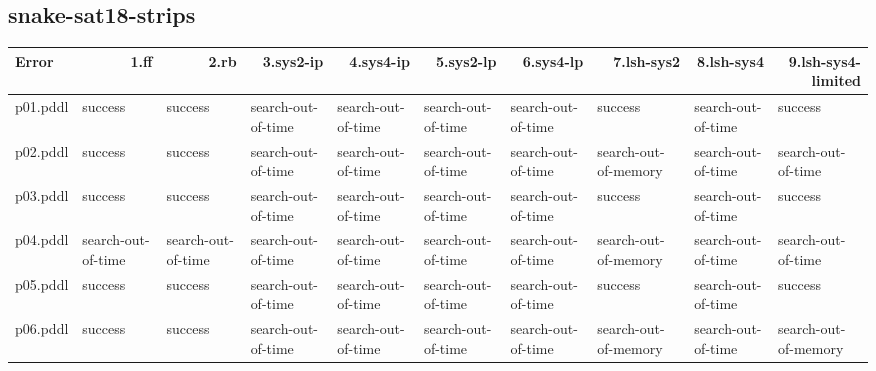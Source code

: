 \documentclass{article}
\begin{document}
\hypertarget{error-snake-sat18-strips}{}
\subsection*{snake-sat18-strips}

\begin{tabular}{@{}lrrrrrrrrr@{}}
Error & 1.ff & 2.rb & 3.sys2-ip & 4.sys4-ip & 5.sys2-lp & 6.sys4-lp & 7.lsh-sys2 & 8.lsh-sys4 & 9.lsh-sys4-limited \\
\midrule
p01.pddl & \multicolumn{1}{|l|}{success} & \multicolumn{1}{|l|}{success} & \multicolumn{1}{|l|}{search-out-of-time} & \multicolumn{1}{|l|}{search-out-of-time} & \multicolumn{1}{|l|}{search-out-of-time} & \multicolumn{1}{|l|}{search-out-of-time} & \multicolumn{1}{|l|}{success} & \multicolumn{1}{|l|}{search-out-of-time} & \multicolumn{1}{|l|}{success} \\
p02.pddl & \multicolumn{1}{|l|}{success} & \multicolumn{1}{|l|}{success} & \multicolumn{1}{|l|}{search-out-of-time} & \multicolumn{1}{|l|}{search-out-of-time} & \multicolumn{1}{|l|}{search-out-of-time} & \multicolumn{1}{|l|}{search-out-of-time} & \multicolumn{1}{|l|}{search-out-of-memory} & \multicolumn{1}{|l|}{search-out-of-time} & \multicolumn{1}{|l|}{search-out-of-time} \\
p03.pddl & \multicolumn{1}{|l|}{success} & \multicolumn{1}{|l|}{success} & \multicolumn{1}{|l|}{search-out-of-time} & \multicolumn{1}{|l|}{search-out-of-time} & \multicolumn{1}{|l|}{search-out-of-time} & \multicolumn{1}{|l|}{search-out-of-time} & \multicolumn{1}{|l|}{success} & \multicolumn{1}{|l|}{search-out-of-time} & \multicolumn{1}{|l|}{success} \\
p04.pddl & \multicolumn{1}{|l|}{search-out-of-time} & \multicolumn{1}{|l|}{search-out-of-time} & \multicolumn{1}{|l|}{search-out-of-time} & \multicolumn{1}{|l|}{search-out-of-time} & \multicolumn{1}{|l|}{search-out-of-time} & \multicolumn{1}{|l|}{search-out-of-time} & \multicolumn{1}{|l|}{search-out-of-memory} & \multicolumn{1}{|l|}{search-out-of-time} & \multicolumn{1}{|l|}{search-out-of-time} \\
p05.pddl & \multicolumn{1}{|l|}{success} & \multicolumn{1}{|l|}{success} & \multicolumn{1}{|l|}{search-out-of-time} & \multicolumn{1}{|l|}{search-out-of-time} & \multicolumn{1}{|l|}{search-out-of-time} & \multicolumn{1}{|l|}{search-out-of-time} & \multicolumn{1}{|l|}{success} & \multicolumn{1}{|l|}{search-out-of-time} & \multicolumn{1}{|l|}{success} \\
p06.pddl & \multicolumn{1}{|l|}{success} & \multicolumn{1}{|l|}{success} & \multicolumn{1}{|l|}{search-out-of-time} & \multicolumn{1}{|l|}{search-out-of-time} & \multicolumn{1}{|l|}{search-out-of-time} & \multicolumn{1}{|l|}{search-out-of-time} & \multicolumn{1}{|l|}{search-out-of-memory} & \multicolumn{1}{|l|}{search-out-of-time} & \multicolumn{1}{|l|}{search-out-of-memory} \\

\end{tabular}
\end{document}
